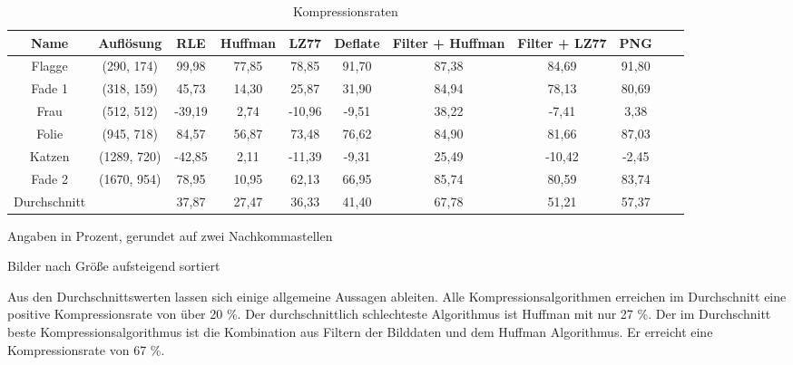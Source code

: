 \documentclass[conference]{IEEEtran}
\begin{document}
\begin{table}[ht]
  \renewcommand*{\arraystretch}{1.1}
  \centering
  \begin{threeparttable}
    \caption{Kompressionsraten}
    \begin{tabular}{c *9{c} S[table-format=5.9]}
      \toprule
      Name         & Auflösung   & RLE    & Huffman & LZ77   & Deflate & Filter + Huffman & Filter + LZ77 & PNG   \\
      \midrule
      Flagge       & (290, 174)  & 99,98  & 77,85   & 78,85  & 91,70   & 87,38            & 84,69         & 91,80 \\
      Fade 1       & (318, 159)  & 45,73  & 14,30   & 25,87  & 31,90   & 84,94            & 78,13         & 80,69 \\
      Frau         & (512, 512)  & -39,19 & 2,74    & -10,96 & -9,51   & 38,22            & -7,41         & 3,38  \\
      Folie        & (945, 718)  & 84,57  & 56,87   & 73,48  & 76,62   & 84,90            & 81,66         & 87,03 \\
      Katzen       & (1289, 720) & -42,85 & 2,11    & -11,39 & -9,31   & 25,49            & -10,42        & -2,45 \\
      Fade 2       & (1670, 954) & 78,95  & 10,95   & 62,13  & 66,95   & 85,74            & 80,59         & 83,74 \\
      \bottomrule
      Durchschnitt &             & 37,87  & 27,47   & 36,33  & 41,40   & 67,78            & 51,21         & 57,37 \\
    \end{tabular}
    \par{} Angaben in Prozent, gerundet auf zwei Nachkommastellen
    \par{} Bilder nach Größe aufsteigend sortiert
    \label{tab:komprate}
  \end{threeparttable}
\end{table}

Aus den Durchschnittswerten lassen sich einige allgemeine Aussagen ableiten. 
Alle Kompressionsalgorithmen erreichen im Durchschnitt eine positive Kompressionsrate 
von über 20 \%. 
Der durchschnittlich schlechteste Algorithmus ist Huffman mit nur 27 \%. 
Der im Durchschnitt beste Kompressionsalgorithmus ist die Kombination aus Filtern 
der Bilddaten und dem Huffman Algorithmus. 
Er erreicht eine Kompressionsrate von 67 \%.

\end{document}
